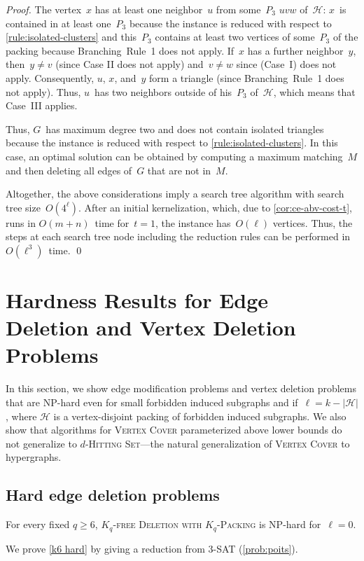 \documentclass[envcountsame,numbook,smallextended]{svjour3}
\numberwithin{equation}{section}
\numberwithin{figure}{section}
\newcommand{\gfdev}[1]{\textsc{\ensuremath{#1}-free Deletion with \ensuremath{#1}-Packing}}
\newcommand{\packing}{\ensuremath{\mathcal H}}
\newcommand{\POITS}{\textsc{3-SAT}}
\begin{document}
\begin{proof}
The vertex~$x$ has at least one
  neighbor~$u$ from some~$P_3$ $uvw$ of~$\packing$: $x$~is contained in at least one~$P_3$
  because the instance is reduced with respect to \cref{rule:isolated-clusters} and
  this~$P_3$ contains at least two vertices of some~$P_3$ of the packing because Branching~Rule~1
  does not apply.  If~$x$ has a further
  neighbor~$y$, then~$y\neq v$ (since Case II does not apply) and~$v\neq w$ since (Case~I) does not apply.
  Consequently, $u$, $x$, and~$y$ form a triangle (since Branching~Rule~1 does not
  apply). 
  Thus, $u$~has two neighbors outside of his~$P_3$ of~$\packing$,
  which means that Case~III applies.

  Thus, $G$~has maximum degree two and does not contain isolated triangles because the instance is reduced with respect to \cref{rule:isolated-clusters}. In this case, an optimal solution
  can be obtained by computing a maximum matching~$M$ and then
  deleting all edges of~$G$ that are not in~$M$.
 
  Altogether,
  the above considerations imply
  a search tree algorithm
  with search tree size~$O(4^{\ell})$. 
  After an initial kernelization, which,
  due to \cref{cor:ce-abv-cost-t}, runs in $O(m+n)$~time
  for~$t=1$, the instance has~$O(\ell)$ vertices.
  Thus, the steps at each search tree node
  including the reduction rules
  can be performed in~$O(\ell^3)$~time.
  \qed
\end{proof}

\section{Hardness Results for Edge Deletion and Vertex Deletion Problems}
\label{sec:hardness}
In this section, we show edge modification problems and vertex deletion problems that are NP-hard even for small forbidden induced subgraphs and if~$\ell=k-|\packing|$, where \(\packing\) is a vertex-disjoint packing of forbidden induced subgraphs.  We also show that algorithms for \textsc{Vertex Cover} parameterized above lower bounds do not generalize to \(d\)-\textsc{Hitting Set}---the natural generalization of \textsc{Vertex Cover} to hypergraphs.
\subsection{Hard edge deletion problems}
\begin{theorem}\label{k6 hard}
For every fixed $q\ge 6$, \gfdev{K_q} is NP-hard for~$\ell=0$.
\end{theorem}
\noindent We prove \cref{k6 hard} by giving a reduction from \POITS{} (\cref{prob:poits}).
\end{document}
